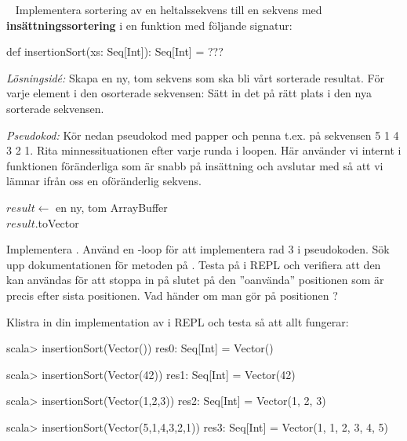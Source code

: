 
\QUESTBEGIN

\Task  \what~ Implementera sortering av en heltalssekvens till en  sekvens med \textbf{insättningssortering}  i en funktion med följande signatur:
\begin{Code}
def insertionSort(xs: Seq[Int]): Seq[Int] = ???
\end{Code}

\emph{Lösningsidé:} Skapa en ny, tom sekvens som ska bli vårt sorterade resultat. För varje element i den osorterade sekvensen: Sätt in det på rätt plats i den nya sorterade sekvensen.

\Subtask \emph{Pseudokod:} Kör nedan pseudokod med papper och penna t.ex. på sekvensen 5 1 4 3 2 1. Rita minnessituationen efter varje runda i loopen. Här använder vi internt i funktionen föränderliga  som är snabb på insättning och avslutar med  så att vi lämnar ifrån oss en oföränderlig sekvens.

\begin{algorithm}[H]
    $result \leftarrow$ en ny, tom ArrayBuffer \\
    $result$.toVector
\end{algorithm}


\Subtask Implementera . Använd en -loop för att implementera rad 3 i pseudokoden. Sök upp dokumentationen för metoden  på . Testa   på  i REPL och verifiera att den kan användas för att stoppa in på slutet på den ''oanvända'' positionen som är precis efter sista positionen. Vad händer om man gör  på positionen ?

Klistra in din implementation av  i REPL och testa så att allt fungerar:
\begin{REPL}
scala> insertionSort(Vector())
res0: Seq[Int] = Vector()

scala> insertionSort(Vector(42))
res1: Seq[Int] = Vector(42)

scala> insertionSort(Vector(1,2,3))
res2: Seq[Int] = Vector(1, 2, 3)

scala> insertionSort(Vector(5,1,4,3,2,1))
res3: Seq[Int] = Vector(1, 1, 2, 3, 4, 5)
\end{REPL}


